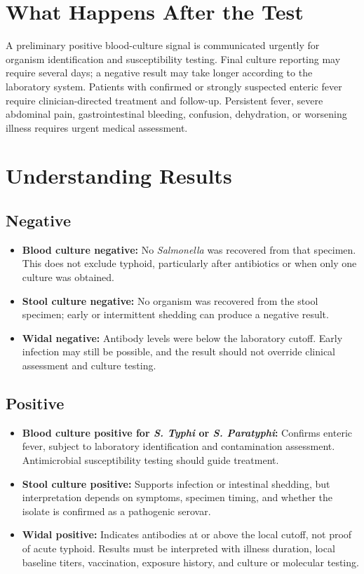 \section*{What Happens After the Test}
A preliminary positive blood-culture signal is communicated urgently for organism identification and susceptibility testing. Final culture reporting may require several days; a negative result may take longer according to the laboratory system. Patients with confirmed or strongly suspected enteric fever require clinician-directed treatment and follow-up. Persistent fever, severe abdominal pain, gastrointestinal bleeding, confusion, dehydration, or worsening illness requires urgent medical assessment.

\section*{Understanding Results}

\subsection*{Negative}
\begin{itemize}
  \item \textbf{Blood culture negative:} No \textit{Salmonella} was recovered from that specimen. This does not exclude typhoid, particularly after antibiotics or when only one culture was obtained.
  \item \textbf{Stool culture negative:} No organism was recovered from the stool specimen; early or intermittent shedding can produce a negative result.
  \item \textbf{Widal negative:} Antibody levels were below the laboratory cutoff. Early infection may still be possible, and the result should not override clinical assessment and culture testing.
\end{itemize}

\subsection*{Positive}
\begin{itemize}
  \item \textbf{Blood culture positive for \textit{S. Typhi} or \textit{S. Paratyphi}:} Confirms enteric fever, subject to laboratory identification and contamination assessment. Antimicrobial susceptibility testing should guide treatment.
  \item \textbf{Stool culture positive:} Supports infection or intestinal shedding, but interpretation depends on symptoms, specimen timing, and whether the isolate is confirmed as a pathogenic serovar.
  \item \textbf{Widal positive:} Indicates antibodies at or above the local cutoff, not proof of acute typhoid. Results must be interpreted with illness duration, local baseline titers, vaccination, exposure history, and culture or molecular testing.
\end{itemize}

